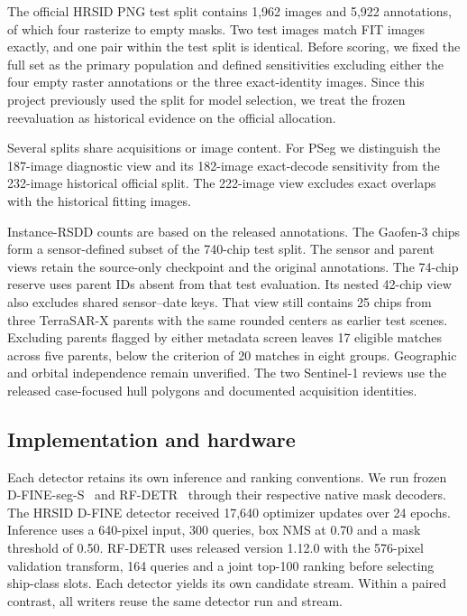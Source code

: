 \documentclass[journal]{IEEEtran}
\begin{document}
The official HRSID PNG test split contains 1,962 images and 5,922 annotations, of which four rasterize to empty masks. Two test images match FIT images exactly, and one pair within the test split is identical. Before scoring, we fixed the full set as the primary population and defined sensitivities excluding either the four empty raster annotations or the three exact-identity images. Since this project previously used the split for model selection, we treat the frozen reevaluation as historical evidence on the official allocation.

Several splits share acquisitions or image content. For PSeg we distinguish the 187-image diagnostic view and its 182-image exact-decode sensitivity from the 232-image historical official split. The 222-image view excludes exact overlaps with the historical fitting images. 

Instance-RSDD counts are based on the released annotations. The Gaofen-3 chips form a sensor-defined subset of the 740-chip test split. The sensor and parent views retain the source-only checkpoint and the original annotations. The 74-chip reserve uses parent IDs absent from that test evaluation. Its nested 42-chip view also excludes shared sensor--date keys. That view still contains 25 chips from three TerraSAR-X parents with the same rounded centers as earlier test scenes. Excluding parents flagged by either metadata screen leaves 17 eligible matches across five parents, below the criterion of 20 matches in eight groups. Geographic and orbital independence remain unverified. The two Sentinel-1 reviews use the released case-focused hull polygons and documented acquisition identities.

\subsection{Implementation and hardware}

Each detector retains its own inference and ranking conventions. We run frozen D-FINE-seg-S~\cite{dfine} and RF-DETR~\cite{rfdetr} through their respective native mask decoders. The HRSID D-FINE detector received 17,640 optimizer updates over 24 epochs. Inference uses a 640-pixel input, 300 queries, box NMS at 0.70 and a mask threshold of 0.50. RF-DETR uses released version 1.12.0 with the 576-pixel validation transform, 164 queries and a joint top-100 ranking before selecting ship-class slots. Each detector yields its own candidate stream. Within a paired contrast, all writers reuse the same detector run and stream.
\end{document}
